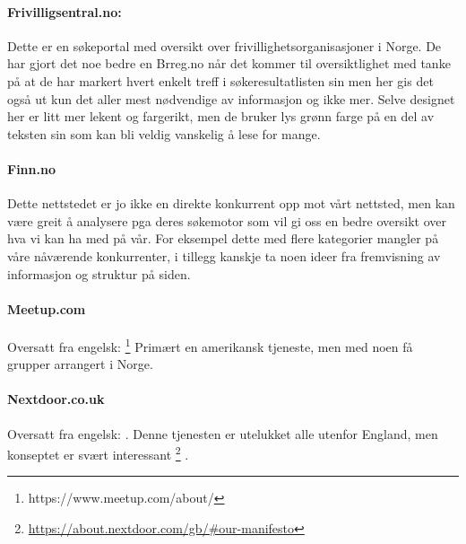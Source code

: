 \paragraph{Frivilligsentral.no:}
Dette er en søkeportal med oversikt over frivillighetsorganisasjoner i Norge. De har gjort det noe bedre en Brreg.no når det kommer til oversiktlighet med tanke på at de har markert hvert enkelt treff i søkeresultatlisten sin men her gis det også ut kun det aller mest nødvendige av informasjon og ikke mer. Selve designet her er litt mer lekent og fargerikt, men de bruker lys grønn farge på en del av teksten sin som kan bli veldig vanskelig å lese for mange.

\paragraph{Finn.no}
Dette nettstedet er jo ikke en direkte konkurrent opp mot vårt nettsted, men kan være greit å analysere pga deres søkemotor som vil gi oss en bedre oversikt over hva vi kan ha med på vår. For eksempel dette med flere kategorier mangler på våre nåværende konkurrenter, i tillegg kanskje ta noen ideer fra fremvisning av informasjon og struktur på siden.

\paragraph{Meetup.com}
Oversatt fra engelsk:
  \footnote{https://www.meetup.com/about/} Primært en amerikansk tjeneste, men med noen få grupper arrangert i Norge.


\paragraph{Nextdoor.co.uk}
Oversatt fra engelsk:
. Denne tjenesten er utelukket alle utenfor England, men konseptet er svært interessant \footnote{\url{https://about.nextdoor.com/gb/\#our-manifesto}} .

